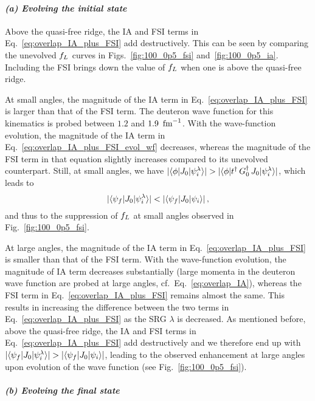 	\paragraph{\emph{(a) Evolving the initial state}}	 Above the quasi-free ridge,
	the IA and FSI terms in
	Eq.~\eqref{eq:overlap_IA_plus_FSI} add destructively.  This can be seen by
	comparing the unevolved $f_L$ curves in Figs.~\ref{fig:100_0p5_fsi}
	and~\ref{fig:100_0p5_ia}.  Including the FSI brings down
	the value of $f_L$ when one is above the quasi-free ridge.

	At small angles, the magnitude of the IA term in
	Eq.~\eqref{eq:overlap_IA_plus_FSI} is larger than that of the FSI term.  The
	deuteron wave function for this kinematics is probed between $1.2$ and
	$1.9~\,\text{fm}^{-1}$.  With the wave-function evolution, the magnitude of the IA
	term in Eq.~\eqref{eq:overlap_IA_plus_FSI_evol_wf} decreases, whereas the
	magnitude of the FSI term in that equation slightly increases compared to its
	unevolved counterpart.  Still, at small angles, we have
	$|\langle \phi|J_0|\psi_i^\lambda\rangle| > |\langle \phi|t^\dag \,
	G_0^\dag \, J_0|\psi_i^\lambda\rangle|$, which leads to
	\begin{equation}
	 |\langle \psi_f|J_0|\psi_i^\lambda\rangle| < |\langle \psi_f|J_0|\psi_i\rangle| \,,
	 \label{eq:psi_i_evolution_small_angles_above_qfr}
	\end{equation}
	and thus to the suppression of $f_L$ at small angles observed in
	Fig.~\ref{fig:100_0p5_fsi}.

	At large angles, the magnitude of the IA term in
	Eq.~\eqref{eq:overlap_IA_plus_FSI} is smaller than that of the FSI term.
	With the wave-function evolution, the magnitude of IA term decreases
	substantially (large momenta in the deuteron wave function are probed at
	large	angles, cf.~Eq.~\eqref{eq:overlap_IA}), whereas the FSI term in
	Eq.~\eqref{eq:overlap_IA_plus_FSI} remains almost the same.  This results in
	increasing the difference between the two terms in
	Eq.~\eqref{eq:overlap_IA_plus_FSI} as the SRG $\lambda$ is decreased.  As
	mentioned before, above the quasi-free ridge, the IA and FSI terms
	in Eq.~\eqref{eq:overlap_IA_plus_FSI} add destructively and we therefore end
	up with $|\langle \psi_f|J_0|\psi_i^\lambda\rangle| >
	|\langle \psi_f|J_0|\psi_i\rangle|$, leading to the observed enhancement at large
	angles upon evolution of the wave function (see Fig.~\ref{fig:100_0p5_fsi}).

	\paragraph{\emph{(b) Evolving the final state}}

